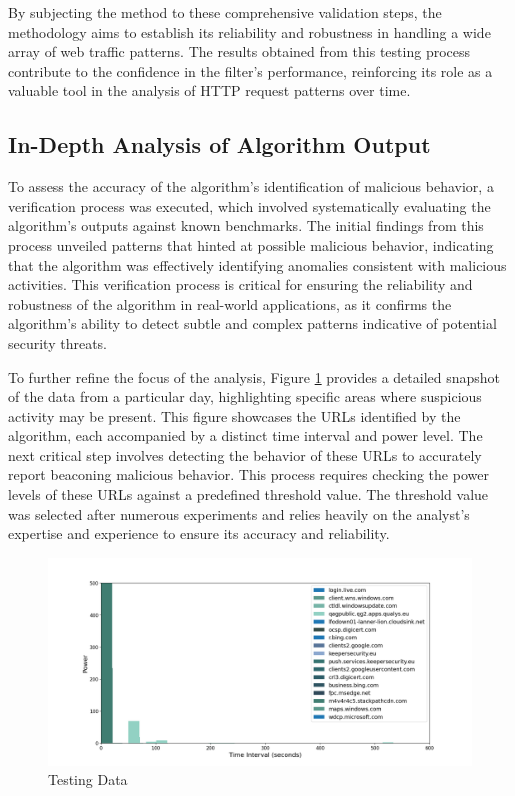 By subjecting the method to these comprehensive validation steps, the methodology aims to establish its reliability and robustness in handling a wide array of web traffic patterns. The results obtained from this testing process contribute to the confidence in the filter's performance, reinforcing its role as a valuable tool in the analysis of HTTP request patterns over time.

\subsection{In-Depth Analysis of Algorithm Output}

To assess the accuracy of the algorithm's identification of malicious behavior, a verification process was executed, which involved systematically evaluating the algorithm's outputs against known benchmarks. The initial findings from this process unveiled patterns that hinted at possible malicious behavior, indicating that the algorithm was effectively identifying anomalies consistent with malicious activities. This verification process is critical for ensuring the reliability and robustness of the algorithm in real-world applications, as it confirms the algorithm's ability to detect subtle and complex patterns indicative of potential security threats.

To further refine the focus of the analysis, Figure \ref{fig:report} provides a detailed snapshot of the data from a particular day, highlighting specific areas where suspicious activity may be present. This figure showcases the URLs identified by the algorithm, each accompanied by a distinct time interval and power level. The next critical step involves detecting the behavior of these URLs to accurately report beaconing malicious behavior. This process requires checking the power levels of these URLs against a predefined threshold value. The threshold value was selected after numerous experiments and relies heavily on the analyst's expertise and experience to ensure its accuracy and reliability.

\begin{figure}
    \centering
    \includegraphics[width=\textwidth]{../Thesis_Docs/media/report.png}
    \caption{Testing Data}
    \label{fig:report}
\end{figure} 

